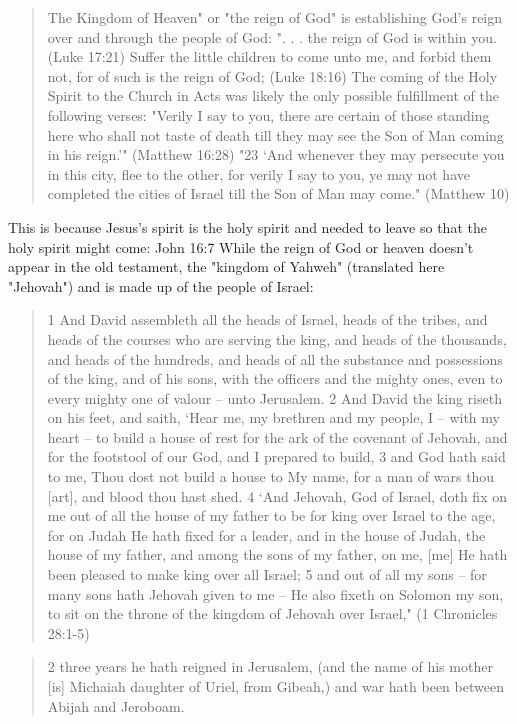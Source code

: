 \documentclass[11pt]{article}
\begin{document}
\begin{thebibliography}{37}
\begin{quote}
The Kingdom of Heaven" or "the reign of God" is establishing God's reign over and through the people of God:  ". . .   the reign of God is within you. (Luke 17:21) 
Suffer the little children to come unto me, and forbid them not, for of such is the reign of God; (Luke 18:16)
The coming of the Holy Spirit to the Church in Acts was likely the only possible fulfillment of the following verses:
"Verily I say to you, there are certain of those standing here who shall not taste of death till they may see the Son of Man coming in his reign.'" (Matthew 16:28)
"23 `And whenever they may persecute you in this city, flee to the other, for verily I say to you, ye may not have completed the cities of Israel till the Son of Man may come." (Matthew 10)
\end{quote}
This is because Jesus's spirit is the holy spirit and needed to leave so that the holy spirit might come: John 16:7
While the reign of God or heaven doesn't appear in the old testament, the "kingdom of Yahweh" (translated here "Jehovah") and is made up of the people of Israel: 
\begin{quote}
1 And David assembleth all the heads of Israel, heads of the tribes, and heads of the courses who are serving the king, and heads of the thousands, and heads of the hundreds, and heads of all the substance and possessions of the king, and of his sons, with the officers and the mighty ones, even to every mighty one of valour -- unto Jerusalem.
2 And David the king riseth on his feet, and saith, `Hear me, my brethren and my people, I -- with my heart -- to build a house of rest for the ark of the covenant of Jehovah, and for the footstool of our God, and I prepared to build,
3 and God hath said to me, Thou dost not build a house to My name, for a man of wars thou [art], and blood thou hast shed.
4 `And Jehovah, God of Israel, doth fix on me out of all the house of my father to be for king over Israel to the age, for on Judah He hath fixed for a leader, and in the house of Judah, the house of my father, and among the sons of my father, on me, [me] He hath been pleased to make king over all Israel;
5 and out of all my sons -- for many sons hath Jehovah given to me -- He also fixeth on Solomon my son, to sit on the throne of the kingdom of Jehovah over Israel," (1 Chronicles 28:1-5)
\end{quote}
\begin{quote}
2 three years he hath reigned in Jerusalem, (and the name of his mother [is] Michaiah daughter of Uriel, from Gibeah,) and war hath been between Abijah and Jeroboam.

\end{quote}
\end{thebibliography}
\end{document}
